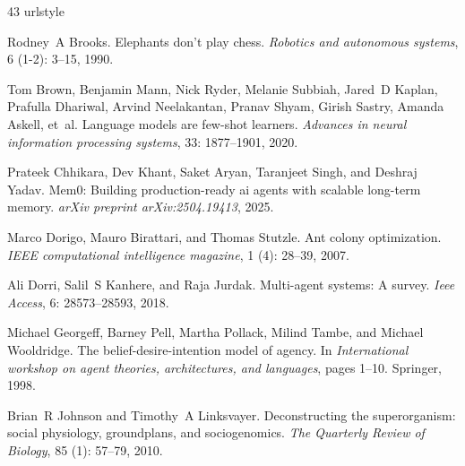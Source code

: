 \begin{thebibliography}{43}
\providecommand{\natexlab}[1]{#1}
\providecommand{\url}[1]{\texttt{#1}}
\expandafter\ifx\csname urlstyle\endcsname\relax
  \providecommand{\doi}[1]{doi: #1}\else
  \providecommand{\doi}{doi: \begingroup \urlstyle{rm}\Url}\fi

Rodney~A Brooks.
\newblock Elephants don't play chess.
\newblock \emph{Robotics and autonomous systems}, 6 (1-2): 3--15, 1990.

Tom Brown, Benjamin Mann, Nick Ryder, Melanie Subbiah, Jared~D Kaplan, Prafulla Dhariwal, Arvind Neelakantan, Pranav Shyam, Girish Sastry, Amanda Askell, et~al.
\newblock Language models are few-shot learners.
\newblock \emph{Advances in neural information processing systems}, 33: 1877--1901, 2020.

Prateek Chhikara, Dev Khant, Saket Aryan, Taranjeet Singh, and Deshraj Yadav.
\newblock Mem0: Building production-ready ai agents with scalable long-term memory.
\newblock \emph{arXiv preprint arXiv:2504.19413}, 2025.

Marco Dorigo, Mauro Birattari, and Thomas Stutzle.
\newblock Ant colony optimization.
\newblock \emph{IEEE computational intelligence magazine}, 1 (4): 28--39, 2007.

Ali Dorri, Salil~S Kanhere, and Raja Jurdak.
\newblock Multi-agent systems: A survey.
\newblock \emph{Ieee Access}, 6: 28573--28593, 2018.

Michael Georgeff, Barney Pell, Martha Pollack, Milind Tambe, and Michael Wooldridge.
\newblock The belief-desire-intention model of agency.
\newblock In \emph{International workshop on agent theories, architectures, and languages}, pages 1--10. Springer, 1998.

Brian~R Johnson and Timothy~A Linksvayer.
\newblock Deconstructing the superorganism: social physiology, groundplans, and sociogenomics.
\newblock \emph{The Quarterly Review of Biology}, 85 (1): 57--79, 2010.


\end{thebibliography}
